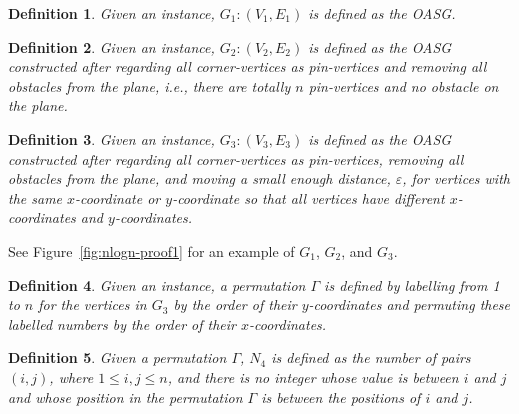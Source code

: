 \documentclass[]{article}
\newtheorem{Definition}{Definition}
\begin{document}
\begin{qunlist}
{{\begin{Definition}\label{def:g1}
Given an instance, $G_1:(V_1,E_1)$ is defined as the OASG.
\end{Definition}

\begin{Definition}\label{def:g2}
Given an instance, $G_2:(V_2,E_2)$ is defined as the OASG constructed after regarding all corner-vertices as pin-vertices and removing all obstacles from the plane, \emph{i.e.}, there are totally $n$ pin-vertices and no obstacle on the plane.
\end{Definition}

\begin{Definition}\label{def:g3}
Given an instance, $G_3:(V_3,E_3)$ is defined as the OASG constructed after regarding all corner-vertices as pin-vertices, removing all obstacles from the plane, and moving a small enough distance, $\varepsilon$, for vertices with the same $x$-coordinate or $y$-coordinate so that all vertices have different $x$-coordinates and $y$-coordinates.
\end{Definition}


See Figure~\ref{fig:nlogn-proof1} for an example of $G_1$, $G_2$, and $G_3$.

\begin{Definition}\label{def:gamma}
Given an instance, a permutation $\Gamma$ is defined by labelling from 1 to $n$ for the vertices in $G_3$ by the order of their $y$-coordinates and permuting these labelled numbers by the order of their $x$-coordinates.
\end{Definition}

\begin{Definition}\label{def:n4}
Given a permutation $\Gamma$, $N_4$ is defined as the number of pairs $(i,j)$, where $1\leq i,j\leq n$, and there is no integer whose value is between $i$ and $j$ and whose position in the permutation $\Gamma$ is between the positions of $i$ and $j$.
\end{Definition}


}}
\end{qunlist}
\end{document}
